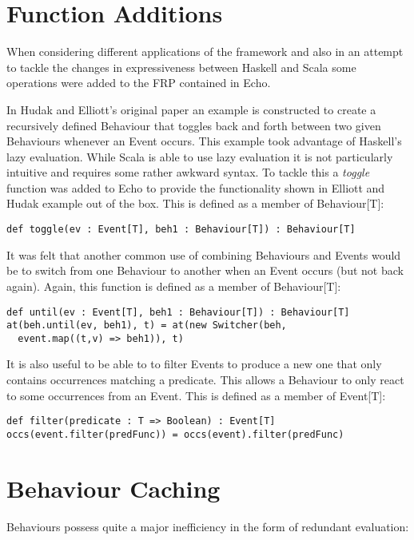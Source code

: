   \section{Function Additions}
    When considering different applications of the framework and also in an attempt to
    tackle the changes in expressiveness between Haskell and Scala some operations
    were added to the FRP contained in Echo.
        
    In Hudak and Elliott's original paper an example is constructed to create a recursively defined Behaviour
    that toggles back and forth between two given Behaviours whenever an Event occurs. This
    example took advantage of Haskell's lazy evaluation. While Scala is able to use lazy evaluation
    it is not particularly intuitive and requires some rather awkward syntax. To tackle this
    a \emph{toggle} function was added to Echo to provide the functionality shown in Elliott and Hudak example out of the box.
    This is defined as a member of Behaviour[T]:
    
\begin{verbatim}
def toggle(ev : Event[T], beh1 : Behaviour[T]) : Behaviour[T]
\end{verbatim}        
    
    It was felt that another common use of combining Behaviours and Events would be
    to switch from one Behaviour to another when an Event occurs (but not back again). Again, this
    function is defined as a member of Behaviour[T]:

\begin{verbatim}
def until(ev : Event[T], beh1 : Behaviour[T]) : Behaviour[T]
at(beh.until(ev, beh1), t) = at(new Switcher(beh, 
  event.map((t,v) => beh1)), t)
\end{verbatim}        
    
    It is also useful to be able to to filter Events to produce a new one that only
    contains occurrences matching a predicate. This allows a Behaviour to only react
    to some occurrences from an Event. This is defined as a member of Event[T]:

\begin{verbatim}
def filter(predicate : T => Boolean) : Event[T]
occs(event.filter(predFunc)) = occs(event).filter(predFunc)
\end{verbatim}  

  \section{Behaviour Caching}
    \label{sec:caching}
    Behaviours possess quite a major inefficiency in the form of redundant evaluation:

